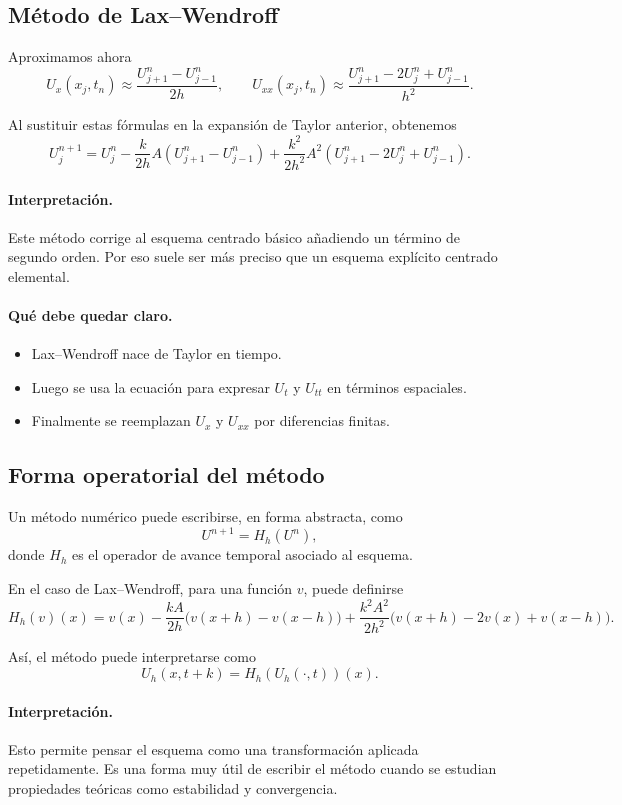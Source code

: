 \subsection{Método de Lax--Wendroff}

Aproximamos ahora
\[
U_x(x_j,t_n)\approx \frac{U_{j+1}^n-U_{j-1}^n}{2h},
\qquad
U_{xx}(x_j,t_n)\approx \frac{U_{j+1}^n-2U_j^n+U_{j-1}^n}{h^2}.
\]

Al sustituir estas fórmulas en la expansión de Taylor anterior, obtenemos
\[
U_j^{n+1}
=
U_j^n
-\frac{k}{2h}A\left(U_{j+1}^n-U_{j-1}^n\right)
+\frac{k^2}{2h^2}A^2\left(U_{j+1}^n-2U_j^n+U_{j-1}^n\right).
\]

\paragraph{Interpretación.}
Este método corrige al esquema centrado básico añadiendo un término de segundo orden. Por eso suele ser más preciso que un esquema explícito centrado elemental.

\paragraph{Qué debe quedar claro.}
\begin{itemize}
    \item Lax--Wendroff nace de Taylor en tiempo.
    \item Luego se usa la ecuación para expresar \(U_t\) y \(U_{tt}\) en términos espaciales.
    \item Finalmente se reemplazan \(U_x\) y \(U_{xx}\) por diferencias finitas.
\end{itemize}

\subsection{Forma operatorial del método}

Un método numérico puede escribirse, en forma abstracta, como
\[
U^{n+1}=H_h(U^n),
\]
donde \(H_h\) es el operador de avance temporal asociado al esquema.

En el caso de Lax--Wendroff, para una función \(v\), puede definirse
\[
H_h(v)(x)
=
v(x)
-
\frac{kA}{2h}\bigl(v(x+h)-v(x-h)\bigr)
+
\frac{k^2A^2}{2h^2}\bigl(v(x+h)-2v(x)+v(x-h)\bigr).
\]

Así, el método puede interpretarse como
\[
U_h(x,t+k)=H_h(U_h(\cdot,t))(x).
\]

\paragraph{Interpretación.}
Esto permite pensar el esquema como una transformación aplicada repetidamente. Es una forma muy útil de escribir el método cuando se estudian propiedades teóricas como estabilidad y convergencia.

